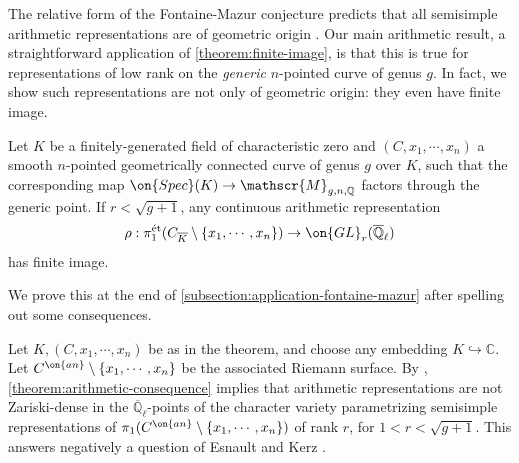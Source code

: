 The relative form of the Fontaine-Mazur conjecture predicts
that all semisimple arithmetic representations are of geometric origin
\cite[Conjecture 1 bis]{petrov2020geometrically}. Our main arithmetic result, a
straightforward application of \autoref{theorem:finite-image}, is that this is true for representations of low rank on the \emph{generic} $n$-pointed curve of genus $g$.
In fact, we show such representations are not only of geometric origin:
they even have finite image.
\begin{theorem}
\notready\label{theorem:arithmetic-consequence}
Let $K$ be a finitely-generated field of characteristic zero and $(C, x_1,
\cdots, x_n)$ a smooth $n$-pointed geometrically connected curve of genus $g$
over $K$,
such that the corresponding map $\on{Spec}(K)\to \mathscr{M}_{g,n, \mathbb{Q}}$ factors through the generic point.
If $r<\sqrt{g+1}$, any continuous arithmetic representation
\begin{align*}
\rho: \pi_1^{\text{\'et}}(C_{\overline{K}}\setminus\{x_1, \cdots, x_n\})\to \on{GL}_r(\overline{\mathbb{Q}}_\ell)
\end{align*}
has finite image.
\end{theorem}
We prove this at the end of \autoref{subsection:application-fontaine-mazur}
after spelling out
some consequences.
\begin{remark}
\notready\label{remark:esnault-kerz}
	Let $K, (C, x_1, \cdots, x_n)$ be as in the theorem, and choose any
	embedding $K\hookrightarrow \mathbb{C}$. Let $C^{\on{an}}\setminus\{x_1,
	\cdots, x_n\}$ be the associated Riemann surface. By \cite[Lemma 7.5.1]{LL:geometric-local-systems},
	\autoref{theorem:arithmetic-consequence} implies that arithmetic
	representations are not Zariski-dense in the
	$\overline{\mathbb{Q}}_\ell$-points of the character variety
	parametrizing semisimple representations of
	$\pi_1(C^{\on{an}}\setminus\{x_1, \cdots, x_n\})$ of rank $r$, for
	$1<r<\sqrt{g+1}$. This answers negatively a question of Esnault and Kerz
	\cite[Question 9.1(1)]{esnault2020arithmetic}.
\end{remark}



